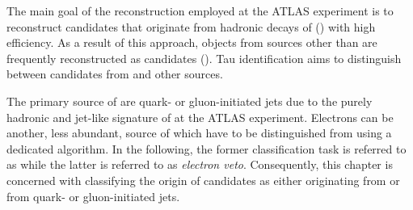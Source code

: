 The main goal of the \tauhadvis reconstruction employed at the ATLAS
experiment is to reconstruct \tauhadvis candidates that originate from
hadronic decays of \tauleptons (\truetauhadvis) with high
efficiency. As a result of this approach, objects from sources other
than \tauhad are frequently reconstructed as \tauhadvis candidates
(\faketauhadvis). Tau identification aims to distinguish between
\tauhadvis candidates from \tauhad and other sources.

The primary source of \faketauhadvis are quark- or gluon-initiated
jets due to the purely hadronic and jet-like signature of \tauhadvis
at the ATLAS experiment. Electrons can be another, less abundant,
source of \faketauhadvis which have to be distinguished from
\truetauhadvis using a dedicated algorithm. In the following, the
former classification task is referred to as \tauid while the latter
is referred to as \emph{electron veto}. Consequently, this chapter is
concerned with classifying the origin of \tauhadvis candidates as
either originating from \tauhad or from quark- or gluon-initiated
jets.

